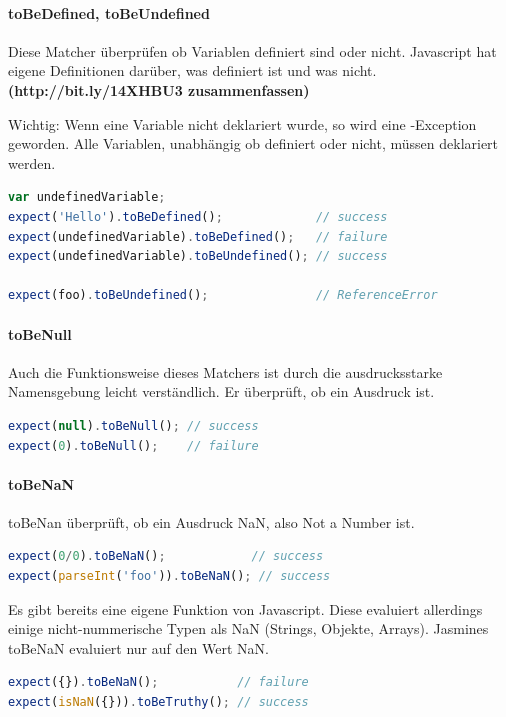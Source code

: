 \paragraph{toBeDefined, toBeUndefined}
Diese Matcher überprüfen ob Variablen definiert sind oder nicht. Javascript hat eigene Definitionen darüber, was definiert ist und was nicht. \textbf{(http://bit.ly/14XHBU3 zusammenfassen)}

Wichtig: Wenn eine Variable nicht deklariert wurde, so wird eine -Exception geworden. Alle Variablen, unabhängig ob definiert oder nicht, müssen deklariert werden.
\begin{lstlisting}[language=JavaScript]
var undefinedVariable;
expect('Hello').toBeDefined();             // success
expect(undefinedVariable).toBeDefined();   // failure
expect(undefinedVariable).toBeUndefined(); // success

expect(foo).toBeUndefined();               // ReferenceError
\end{lstlisting}

\paragraph{toBeNull}
Auch die Funktionsweise dieses Matchers ist durch die ausdrucksstarke Namensgebung leicht verständlich. Er überprüft, ob ein Ausdruck  ist.
\begin{lstlisting}[language=JavaScript]
expect(null).toBeNull(); // success
expect(0).toBeNull();    // failure
\end{lstlisting}

\paragraph{toBeNaN}
toBeNan überprüft, ob ein Ausdruck NaN, also Not a Number ist.
\begin{lstlisting}[language=JavaScript]
expect(0/0).toBeNaN();            // success
expect(parseInt('foo')).toBeNaN(); // success
\end{lstlisting}

Es gibt bereits eine eigene  Funktion von Javascript. Diese evaluiert allerdings einige nicht-nummerische Typen als NaN (Strings, Objekte, Arrays). Jasmines toBeNaN evaluiert nur auf den Wert NaN.

\begin{lstlisting}[language=JavaScript]
expect({}).toBeNaN();           // failure
expect(isNaN({})).toBeTruthy(); // success
\end{lstlisting}

